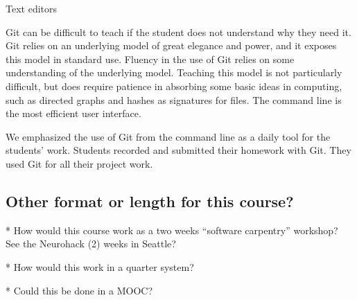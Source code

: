 Text editors

%




Git can be difficult to teach if the student does not understand why they need
it.
Git relies on an underlying model of great elegance and power, and it
exposes this model in standard use.
Fluency in the use of Git relies on some understanding of the underlying model.
Teaching this model is not particularly difficult, but does require patience in
absorbing some basic ideas in computing, such as directed graphs and hashes as
signatures for files.
The command line is the most efficient user interface.

We emphasized the use of Git from the command line as a daily tool for the
students' work.
Students recorded and submitted their homework with Git.
They used Git for all their project work.


\subsection{Other format or length for this course?}

* How would this course work as a two weeks ``software carpentry'' workshop?
See the Neurohack (2) weeks in Seattle?

* How would this work in a quarter system?

* Could this be done in a MOOC?

